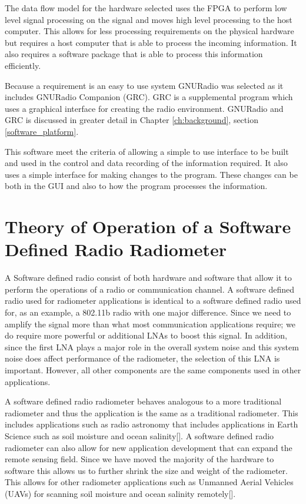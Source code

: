 The data flow model for the hardware selected uses the FPGA to perform low level signal processing on the signal and moves high level processing to the host computer.  This allows for less processing requirements on the physical hardware but requires a host computer that is able to process the incoming information.  It also requires a software package that is able to process this information efficiently. 

Because a requirement is an easy to use system GNURadio was selected as it includes GNURadio Companion (GRC). GRC is a supplemental program which uses a graphical interface for creating the radio environment.  GNURadio and GRC is discussed in greater detail in Chapter \ref{ch:background}, section \ref{software_platform}. 

This software meet the criteria of allowing a simple to use interface to be built and used in the control and data recording of the information required.  It also uses a simple interface for making changes to the program.  These changes can be both in the GUI and also to how the program processes the information.

\section{Theory of Operation of a Software Defined Radio Radiometer}

A Software defined radio consist of both hardware and software that allow it to perform the operations of a radio or communication channel.  A software defined radio used for radiometer applications is identical to a software defined radio used for, as an example, a 802.11b radio with one major difference.  Since we need to amplify the signal more than what most communication applications require; we do require more powerful or additional LNAs to boost this signal.  In addition, since the first LNA plays a major role in the overall system noise and this system noise does affect performance of the radiometer, the selection of this LNA is important.  However, all other components are the same components used in other applications.

A software defined radio radiometer behaves analogous to a more traditional radiometer and thus the application is the same as a traditional radiometer.  This includes applications such as radio astronomy that includes applications in Earth Science such as soil moisture and ocean salinity[\cite{Ruf}].  A software defined radio radiometer can also allow for new application development that can expand the remote sensing field.  Since we have moved the majority of the hardware to software this allows us to further shrink the size and weight of the radiometer.  This allows for other radiometer applications such as Unmanned Aerial Vehicles (UAVs) for scanning soil moisture and ocean salinity remotely[\cite{McIntyre}].  

